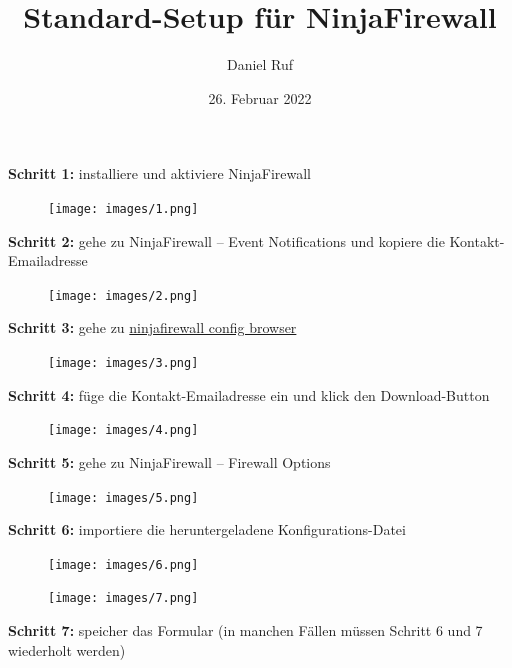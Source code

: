 \documentclass[a4paper]{article}
\title{Standard-Setup für NinjaFirewall}\let\Title\@title
\author{Daniel Ruf}\let\Author\@author
\date{26. Februar 2022} \let\Date\@date
\newcommand{\Version}{1.3.1}
\begin{document}
\lhead{\Title}
\lfoot{v\Version}
\rfoot{\today}

\noindent


\noindent
\textbf{Schritt 1:} installiere und aktiviere NinjaFirewall

\begin{figure}[H]
  \centering
  \texttt{[image: images/1.png]}
\end{figure}

\noindent
\textbf{Schritt 2:} gehe zu NinjaFirewall -- Event Notifications und kopiere die Kontakt-Emailadresse

\begin{figure}[H]
  \centering
  \texttt{[image: images/2.png]}
\end{figure}

\noindent
\textbf{Schritt 3:} gehe zu \href{https://danielruf.github.io/ninjafirewall-config-browser/}{ninjafirewall config browser}

\begin{figure}[H]
  \centering
  \texttt{[image: images/3.png]}
\end{figure}

\newpage

\noindent
\textbf{Schritt 4:} füge die Kontakt-Emailadresse ein und klick den Download-Button

\begin{figure}[H]
  \centering
  \texttt{[image: images/4.png]}
\end{figure}

\noindent
\textbf{Schritt 5:} gehe zu NinjaFirewall -- Firewall Options

\begin{figure}[H]
  \centering
  \texttt{[image: images/5.png]}
\end{figure}

\noindent
\textbf{Schritt 6:} importiere die heruntergeladene Konfigurations-Datei

\begin{figure}[H]
  \centering
  \texttt{[image: images/6.png]}
\end{figure}

\begin{figure}[H]
  \centering
  \texttt{[image: images/7.png]}
\end{figure}

\noindent
\textbf{Schritt 7:} speicher das Formular (in manchen Fällen müssen Schritt 6 und 7 wiederholt werden)
\end{document}
